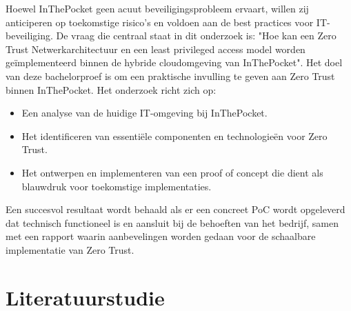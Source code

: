 Hoewel InThePocket geen acuut beveiligingsprobleem ervaart, willen zij anticiperen op toekomstige risico’s en voldoen aan de best practices voor IT-beveiliging. De vraag die centraal staat in dit onderzoek is:  
"Hoe kan een Zero Trust Netwerkarchitectuur en een least privileged access model worden geïmplementeerd binnen de hybride cloudomgeving van InThePocket".
Het doel van deze bachelorproef is om een praktische invulling te geven aan Zero Trust binnen InThePocket. Het onderzoek richt zich op:
\begin{itemize}
  \item Een analyse van de huidige IT-omgeving bij InThePocket.
  \item Het identificeren van essentiële componenten en technologieën voor Zero Trust.
  \item Het ontwerpen en implementeren van een proof of concept die dient als blauwdruk voor toekomstige implementaties.
\end{itemize}

Een succesvol resultaat wordt behaald als er een concreet PoC wordt opgeleverd dat technisch functioneel is en aansluit bij de behoeften van het bedrijf, samen met een rapport waarin aanbevelingen worden gedaan voor de schaalbare implementatie van Zero Trust.


\section{Literatuurstudie}%
\label{sec:literatuurstudie}




